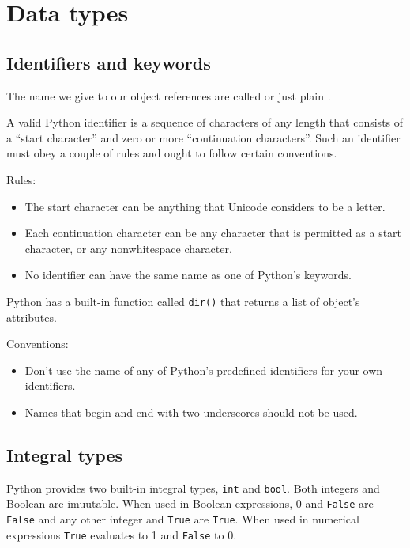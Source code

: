 
\chapter{Data types}

\section{Identifiers and keywords}

The name we give to our object references are called  or just plain .



A valid Python identifier is a  sequence of characters of any length that consists of a ``start character'' and zero or more ``continuation characters''.
Such an identifier must obey a couple of rules and ought to follow certain conventions.


Rules:
\begin{itemize}
\item The start character can be anything that Unicode considers to be a letter.
\item Each continuation character can be any character that is permitted as a start character, or any nonwhitespace character.
\item No identifier can have the same name as one of Python's keywords.
\end{itemize}


Python has a built-in function called \verb|dir()| that returns a list of object's attributes.


Conventions:
\begin{itemize}
\item Don't use the name of any of Python's predefined identifiers for your own identifiers.
\item Names that begin and end with two underscores should not be used.
\end{itemize}


\section{Integral types}

Python provides two built-in integral types, \verb|int| and \verb|bool|.
Both integers and Boolean are imuutable.
When used in Boolean expressions, 0 and \verb|False| are \verb|False| and any other integer and \verb|True| are \verb|True|.
When used in numerical expressions \verb|True| evaluates to 1 and \verb|False| to 0.



